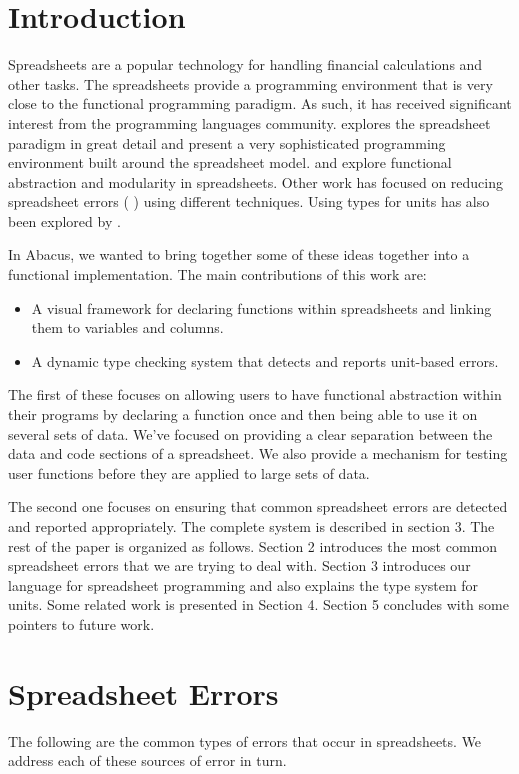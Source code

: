 \documentclass{acm_proc_article-sp}
\begin{document}
\section{Introduction}
Spreadsheets are a popular technology for handling financial calculations and other tasks. The spreadsheets provide
a programming environment that is very close to the functional programming paradigm. As such, it has received
significant interest from the programming languages community. \cite{forms/3} explores the spreadsheet paradigm in
 great detail and present a very sophisticated programming environment built around the spreadsheet
model. \cite{Wakeling:2007:SFP:1194875.1194878} and \cite{Sestoft} explore functional abstraction and modularity
in spreadsheets. Other work has focused on reducing spreadsheet errors (\cite{Coblenz05usingobjects} \cite{Panko98whatwe}) using different
techniques. Using types for units has also been explored by \cite{DBLP:conf/cefp/2009}.

In Abacus, we wanted to bring together some of these ideas together into a functional implementation. The main contributions of this work are:

\begin{itemize}
\item A visual framework for declaring functions within spreadsheets and linking them to variables and columns.
\item A dynamic type checking system that detects and reports unit-based errors.
\end{itemize}

The first of these focuses on allowing users to have functional abstraction within their programs by declaring a function once and then being able to use it on several sets of data. We've focused on providing a clear separation between the data and code sections of a spreadsheet. We also provide a mechanism for testing user functions before they are applied to large sets of data.

The second one focuses on ensuring that common spreadsheet errors are detected and reported appropriately. The complete system is described in section 3. The rest of the paper is organized as follows. Section 2 introduces the most common spreadsheet errors that we are trying to deal with. Section 3 introduces our language for spreadsheet programming and also explains the type system for units. Some related work is presented in Section 4. Section 5 concludes with some pointers to future work.


\section{Spreadsheet Errors}
The following are the common types of errors that occur in
spreadsheets.  We address each of these sources of error in turn.
\end{document}
